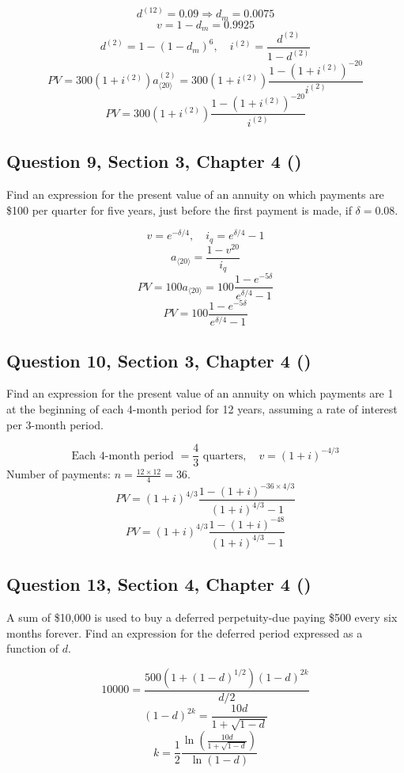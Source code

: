 \documentclass[12pt, a4paper]{article}
\newcommand{\angl}[1]{\langle #1 \rangle}
\begin{document}
\[
d^{(12)} = 0.09 \Rightarrow d_m = 0.0075
\]
\[
v = 1 - d_m = 0.9925
\]
\[
d^{(2)} = 1 - (1 - d_m)^6, \quad i^{(2)} = \frac{d^{(2)}}{1 - d^{(2)}}
\]
\[
PV = 300 (1 + i^{(2)}) a_{\angl{20}}^{(2)} = 300 (1 + i^{(2)}) \frac{1 - (1 + i^{(2)})^{-20}}{i^{(2)}}
\]
\[
\boxed{PV = 300(1 + i^{(2)}) \frac{1 - (1 + i^{(2)})^{-20}}{i^{(2)}}}
\]

\subsection*{Question 9, Section 3, Chapter 4  (\cite{toi3rd})}

\noindent Find an expression for the present value of an annuity on which payments are \$100 per quarter for five years, just before the first payment is made, if \( \delta = 0.08. \)

\[
v = e^{-\delta/4}, \quad i_q = e^{\delta/4} - 1
\]
\[
a_{\angl{20}} = \frac{1 - v^{20}}{i_q}
\]
\[
PV = 100 a_{\angl{20}} = 100 \frac{1 - e^{-5\delta}}{e^{\delta/4} - 1}
\]
\[
\boxed{PV = 100 \frac{1 - e^{-5\delta}}{e^{\delta/4} - 1}}
\]

\subsection*{Question 10, Section 3, Chapter 4  (\cite{toi3rd})}

\noindent Find an expression for the present value of an annuity on which payments are 1 at the beginning of each 4-month period for 12 years, assuming a rate of interest per 3-month period.

\[
\text{Each 4-month period } = \frac{4}{3} \text{ quarters}, \quad v = (1 + i)^{-4/3}
\]
Number of payments: \( n = \frac{12 \times 12}{4} = 36 \).
\[
PV = (1 + i)^{4/3} \frac{1 - (1 + i)^{-36 \times 4/3}}{(1 + i)^{4/3} - 1}
\]
\[
\boxed{PV = (1 + i)^{4/3} \frac{1 - (1 + i)^{-48}}{(1 + i)^{4/3} - 1}}
\]

\subsection*{Question 13, Section 4, Chapter 4  (\cite{toi3rd})}

\noindent A sum of \$10{,}000 is used to buy a deferred perpetuity-due paying \$500 every six months forever. Find an expression for the deferred period expressed as a function of \( d. \)

\[
10000 = \frac{500 (1 + (1 - d)^{1/2})(1 - d)^{2k}}{d/2}
\]
\[
(1 - d)^{2k} = \frac{10d}{1 + \sqrt{1 - d}}
\]
\[
\boxed{k = \frac{1}{2} \frac{\ln\!\left(\frac{10d}{1 + \sqrt{1 - d}}\right)}{\ln(1 - d)}}
\]
\end{document}
